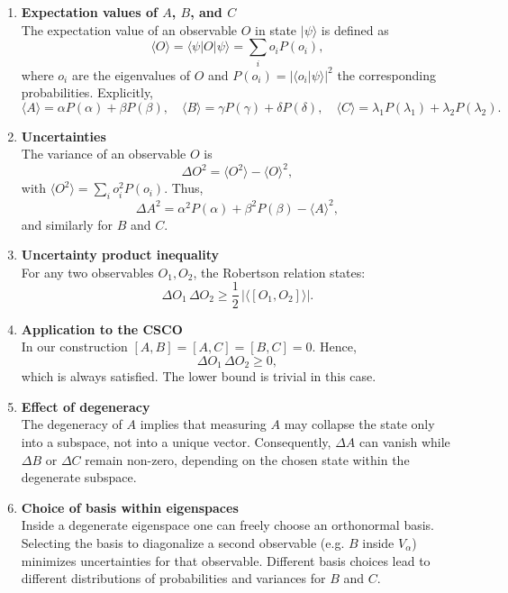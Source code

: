 \documentclass[11pt,a4paper]{article}
\begin{document}
\begin{enumerate}
  \item \textbf{Expectation values of $A$, $B$, and $C$} \\
    The expectation value of an observable $O$ in state $|\psi\rangle$ is defined as
    \[
      \langle O \rangle = \langle \psi | O | \psi \rangle = \sum_i o_i P(o_i),
    \]
    where $o_i$ are the eigenvalues of $O$ and $P(o_i) = |\langle
    o_i|\psi\rangle|^2$ the corresponding probabilities.
    Explicitly,
    \[
      \langle A \rangle = \alpha P(\alpha) + \beta P(\beta), \quad
      \langle B \rangle = \gamma P(\gamma) + \delta P(\delta), \quad
      \langle C \rangle = \lambda_1 P(\lambda_1) + \lambda_2 P(\lambda_2).
    \]

  \item \textbf{Uncertainties} \\
    The variance of an observable $O$ is
    \[
      \Delta O^2 = \langle O^2 \rangle - \langle O \rangle^2,
    \]
    with $\langle O^2 \rangle = \sum_i o_i^2 P(o_i)$. Thus,
    \[
      \Delta A^2 = \alpha^2 P(\alpha) + \beta^2 P(\beta) - \langle A \rangle^2,
    \]
    and similarly for $B$ and $C$.

  \item \textbf{Uncertainty product inequality} \\
    For any two observables $O_1,O_2$, the Robertson relation states:
    \[
      \Delta O_1 \, \Delta O_2 \geq \frac{1}{2}\, \big| \langle [O_1,O_2] \rangle \big|.
    \]

  \item \textbf{Application to the CSCO} \\
    In our construction $[A,B]=[A,C]=[B,C]=0$. Hence,
    \[
      \Delta O_1 \, \Delta O_2 \geq 0,
    \]
    which is always satisfied. The lower bound is trivial in this case.

  \item \textbf{Effect of degeneracy} \\
    The degeneracy of $A$ implies that measuring $A$ may collapse the state only
    into a subspace, not into a unique vector. Consequently, $\Delta A$ can
    vanish while $\Delta B$ or $\Delta C$ remain non-zero, depending on the
    chosen state within the degenerate subspace.

  \item \textbf{Choice of basis within eigenspaces} \\
    Inside a degenerate eigenspace one can freely choose an orthonormal basis.
    Selecting the basis to diagonalize a second observable (e.g. $B$ inside
    $V_\alpha$) minimizes uncertainties for that observable. Different basis
    choices lead to different distributions of probabilities and variances for
    $B$ and $C$.
\end{enumerate}
\end{document}
